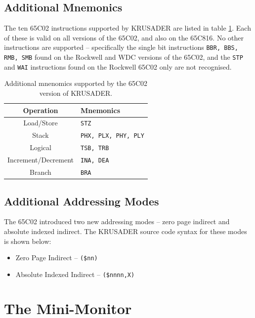 \documentclass[12pt]{article}
\newcommand{\krusader}{\textsf{KRUSADER}\xspace}
\begin{document}
\subsection{Additional Mnemonics}

The ten 65C02 instructions supported by \krusader are listed in table \ref{tab:65C02mnemonics}.
Each of these is valid on all versions of the 65C02, and also on the 65C816.  No other
instructions are supported -- specifically the single bit instructions \texttt{BBR, BBS, RMB, SMB}
found on the Rockwell and WDC versions of the 65C02, and the \texttt{STP} and \texttt{WAI} instructions
found on the Rockwell 65C02 only are not recognised.

\begin{table}[htb]
	\centering
	\begin{tabular}{|c|l|} \hline
	\textbf{Operation} & \textbf{Mnemonics} \tabularnewline
	\hline
	Load/Store & \texttt{STZ} \tabularnewline\hline
	Stack & \texttt{PHX, PLX, PHY, PLY} \tabularnewline\hline
	Logical & \texttt{TSB, TRB} \tabularnewline\hline
	Increment/Decrement & \texttt{INA, DEA} \tabularnewline\hline
	Branch & \texttt{BRA} \tabularnewline
	\hline
	\end{tabular}
	\caption{Additional mnenomics supported by the 65C02 version of \krusader.}
	\label{tab:65C02mnemonics}
\end{table}

\subsection{Additional Addressing Modes}

The 65C02 introduced two new addressing modes -- zero page indirect and 
absolute indexed indirect.  The \krusader source code syntax for these modes is 
shown below:

\begin{itemize}
	\item Zero Page Indirect -- \texttt{(\$nn)}
	\item Absolute Indexed Indirect -- \texttt{(\$nnnn,X)}
\end{itemize}

\section{The Mini-Monitor}
\label{sec:minimonitor}
\end{document}
